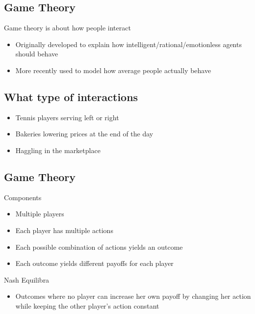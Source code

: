\subsection{Game Theory}
Game theory is about how people interact
\begin{itemize}
    \item Originally developed to explain how intelligent/rational/emotionless agents should behave
    \item More recently used to model how average people actually behave
\end{itemize}
\subsection{What type of interactions}
\begin{itemize}
    \item Tennis players serving left or right
    \item Bakeries lowering prices at the end of the day
    \item Haggling in the marketplace
\end{itemize}
\subsection{Game Theory}
Components
\begin{itemize}
    \item Multiple players
    \item Each player has multiple actions
    \item Each possible combination of actions yields an outcome
    \item Each outcome yields different payoffs for each player
\end{itemize}
Nash Equilibra
\begin{itemize}
    \item Outcomes where no player can increase her own payoff by changing her action while keeping the other player's action constant
\end{itemize}

